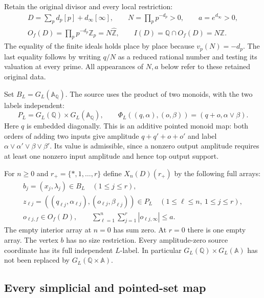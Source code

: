 Retain the original divisor and every local restriction:
\begin{equation}\tag{ASC2}
\begin{gathered}
D=\sum_p d_p[p]+d_\infty[\infty],\qquad
N=\prod_p p^{-d_p}>0,\qquad a=e^{d_\infty}>0,\\
O_f(D)=\prod_p p^{-d_p}\mathbb Z_p=N\widehat{\mathbb Z},\qquad
I(D)=\mathbb Q\cap O_f(D)=N\mathbb Z.
\end{gathered}
\end{equation}
The equality of the finite ideals holds place by place because
$v_p(N)=-d_p$. The last equality follows by writing $q/N$ as a
reduced rational number and testing its valuation at every prime.
All appearances of $N,a$ below refer to these retained original data.

Set $B_L=G_L(\mathbb A_{\mathbb Q})$. The source uses the product
of two monoids, with the two labels independent:
\begin{equation}\tag{ASC3}
P_L=G_L(\mathbb Q)\times G_L(\mathbb A_{\mathbb Q}),\qquad
\Phi_L((q,\alpha),(o,\beta))=(q+o,\alpha\vee\beta).
\end{equation}
Here $q$ is embedded diagonally. This is an additive pointed monoid
map: both orders of adding two inputs give amplitude
$q+q'+o+o'$ and label $\alpha\vee\alpha'\vee\beta\vee\beta'$.
Its value is admissible, since a nonzero output amplitude requires
at least one nonzero input amplitude and hence top output support.

For $n\ge0$ and $r_+=\{*,1,\ldots,r\}$ define $X_n(D)(r_+)$ by
the following full arrays:
\begin{equation}\tag{ASC4}
\begin{gathered}
b_j=(x_j,\lambda_j)\in B_L\quad(1\le j\le r),\\
z_{\ell j}=((q_{\ell j},\alpha_{\ell j}),
             (o_{\ell j},\beta_{\ell j}))\in P_L
       \quad(1\le\ell\le n,\ 1\le j\le r),\\
o_{\ell j,f}\in O_f(D),\qquad
\sum_{\ell=1}^n\sum_{j=1}^r|o_{\ell j,\infty}|\le a.
\end{gathered}
\end{equation}
The empty interior array at $n=0$ has sum zero. At $r=0$ there is
one empty array. The vertex $b$ has no size restriction. Every
amplitude-zero source coordinate has its full independent $L$-label.
In particular $G_L(\mathbb Q)\times G_L(\mathbb A)$ has not been
replaced by $G_L(\mathbb Q\times\mathbb A)$.

\subsection{Every simplicial and pointed-set map}

